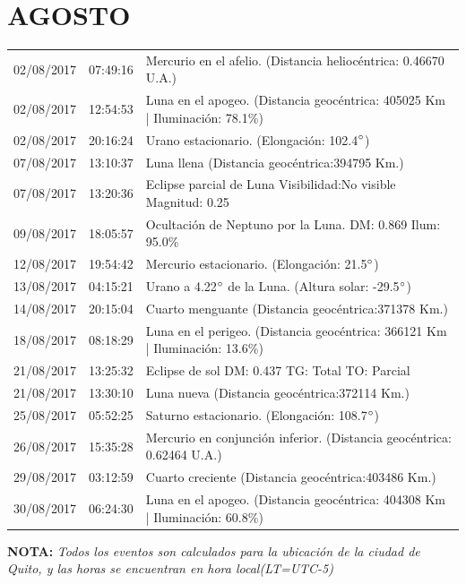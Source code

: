 \documentclass[12pt,a4paper,oneside]{article}
\begin{document}
\section{AGOSTO}
\begin{center}
\begin{tabular}{ |l| l| l| }
\hline
02/08/2017& 07:49:16 &	Mercurio en el afelio. (Distancia heliocéntrica: 0.46670 U.A.)	\\
02/08/2017& 12:54:53 &	Luna en el apogeo. (Distancia geocéntrica: 405025 Km | Iluminación: 78.1\%)	\\
02/08/2017& 20:16:24 &	Urano estacionario. (Elongación: 102.4$\degree $)	\\
07/08/2017& 13:10:37 &	Luna llena (Distancia geocéntrica:394795 Km.)	\\
07/08/2017& 13:20:36 &	Eclipse parcial de Luna Visibilidad:No visible Magnitud: 0.25	\\
09/08/2017& 18:05:57 &	Ocultación de Neptuno por la Luna. DM: 0.869 Ilum: 95.0\% 	\\
12/08/2017& 19:54:42 &	Mercurio estacionario. (Elongación: 21.5$\degree $)	\\
13/08/2017& 04:15:21 &	Urano a 4.22$\degree $ de la Luna. (Altura solar: -29.5$\degree $)	\\
14/08/2017& 20:15:04 &	Cuarto menguante (Distancia geocéntrica:371378 Km.)	\\
18/08/2017& 08:18:29 &	Luna en el perigeo. (Distancia geocéntrica: 366121 Km | Iluminación: 13.6\%)	\\
21/08/2017& 13:25:32 &	Eclipse de sol DM: 0.437 TG: Total TO: Parcial	\\
21/08/2017& 13:30:10 &	Luna nueva (Distancia geocéntrica:372114 Km.)	\\
25/08/2017& 05:52:25 &	Saturno estacionario. (Elongación: 108.7$\degree $)	\\
26/08/2017& 15:35:28 &	Mercurio en conjunción inferior. (Distancia geocéntrica: 0.62464 U.A.)	\\
29/08/2017& 03:12:59 &	Cuarto creciente (Distancia geocéntrica:403486 Km.)	\\
30/08/2017& 06:24:30 &	Luna en el apogeo. (Distancia geocéntrica: 404308 Km | Iluminación: 60.8\%)	\\
\hline
\end{tabular}
\end{center}
\vspace{1cm}
\textbf{NOTA:  }\textit{Todos los eventos son calculados para la ubicaci\'on de la ciudad de Quito, y las horas se encuentran en hora local(LT=UTC-5)}
\vspace{0.7cm}
\newpage
\end{document}
